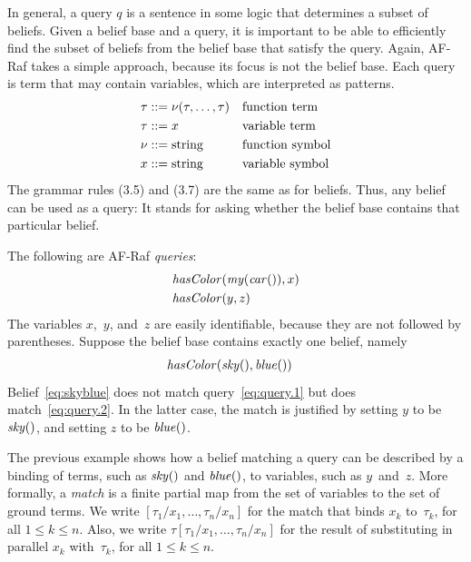 \documentclass[a4paper,12pt,oneside,fleqn]{book} %
\begin{document}
In general, a query $q$ is a sentence in some logic that determines a
subset of beliefs.  Given a belief base and a query, it is important to be
able to efficiently find the subset of beliefs from the belief base that
satisfy the query.  Again, AF-Raf takes a simple approach, because its
focus is not the belief base.  Each query is term that may contain
variables, which are interpreted as patterns.  \begin{align} \tau &::=
\nu(\tau,\ldots,\tau) && \text{function term} \\ \tau &::= x &&
\text{variable term} \\ \nu  &::= {\rm string} &&\text{function symbol} \\
x &::= {\rm string} && \text{variable symbol} \end{align} The grammar rules
(3.5) and (3.7) are the same as for beliefs.  Thus, any belief can be used as
a query:  It stands for asking whether the belief base contains that
particular belief.

\begin{example} The following are AF-Raf \emph{queries}: \begin{align}
&{\it hasColor}({\it my}({\it car}()), x) \label{eq:query.1} \\ &{\it
hasColor}(y, z) \label{eq:query.2} \end{align} The variables $x$,~$y$,
and~$z$ are easily identifiable, because they are not followed by
parentheses.  Suppose the belief base contains exactly one belief, namely
\begin{align} &{\it hasColor}({\it sky}(), {\it blue}()) \label{eq:skyblue}
\end{align} Belief~\eqref{eq:skyblue} does not match
query~\eqref{eq:query.1} but does match~\eqref{eq:query.2}.  In the latter
case, the match is justified by setting $y$ to be ${\it sky}()$, and
setting $z$ to be ${\it blue}()$.
\end{example}

The previous example shows how a belief matching a query can be described
by a binding of terms, such as ${\it sky}()$ and ${\it blue}()$, to
variables, such as $y$~and~$z$.  More formally, a \emph{match} is a finite
partial map from the set of variables to the set of ground terms.  We write
$[\tau_1/x_1,\ldots,\tau_n/x_n]$ for the match that binds $x_k$
to~$\tau_k$, for all $1\le k\le n$.  Also, we write
$\tau[\tau_1/x_1,\ldots,\tau_n/x_n]$ for the result of substituting in
parallel $x_k$ with~$\tau_k$, for all $1\le k\le n$.
\end{document}
